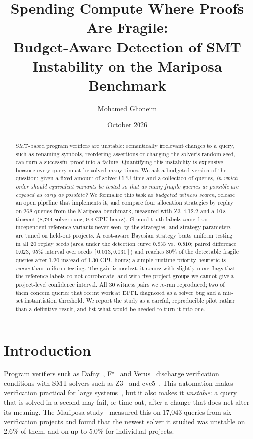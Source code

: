 \documentclass[11pt]{article}
\title{\textbf{Spending Compute Where Proofs Are Fragile:\\
Budget-Aware Detection of SMT Instability on the Mariposa Benchmark}}
\author{Mohamed Ghoneim}
\date{October 2026}
\begin{document}
\maketitle

\begin{abstract}
SMT-based program verifiers are unstable: semantically irrelevant changes to a query, such as renaming symbols, reordering assertions or changing the solver's random seed, can turn a successful proof into a failure. Quantifying this instability is expensive because every query must be solved many times.
We ask a budgeted version of the question: given a fixed amount of solver CPU time and a collection of queries, \emph{in which order should equivalent variants be tested so that as many fragile queries as possible are exposed as early as possible?}
We formalise this task as \emph{budgeted witness search}, release an open pipeline that implements it, and compare four allocation strategies by replay on 268 queries from the Mariposa benchmark, measured with Z3~4.12.2 and a 10\,s timeout (8{,}744 solver runs, 9.8 CPU hours). Ground-truth labels come from independent reference variants never seen by the strategies, and strategy parameters are tuned on held-out projects.
A cost-aware Bayesian strategy beats uniform testing in all 20 replay seeds (area under the detection curve $0.833$ vs.\ $0.810$; paired difference $0.023$, 95\% interval over seeds $[0.013, 0.031]$) and reaches 80\% of the detectable fragile queries after 1.20 instead of 1.30 CPU hours; a simple runtime-priority heuristic is \emph{worse} than uniform testing. The gain is modest, it comes with slightly more flags that the reference labels do not corroborate, and with five project groups we cannot give a project-level confidence interval.
All 30 witness pairs we re-ran reproduced; two of them concern queries that recent work at EPFL diagnosed as a solver bug and a mis-set instantiation threshold.
We report the study as a careful, reproducible pilot rather than a definitive result, and list what would be needed to turn it into one.
\end{abstract}

\section{Introduction}
\label{sec:intro}

Program verifiers such as Dafny~\cite{dafny}, F$^\star$~\cite{fstar} and Verus~\cite{verus} discharge verification conditions with SMT solvers such as Z3~\cite{z3} and cvc5~\cite{cvc5}. This automation makes verification practical for large systems~\cite{ironfleet,komodo,veribetrkv}, but it also makes it \emph{unstable}: a query that is solved in a second may fail, or time out, after a change that does not alter its meaning. The Mariposa study~\cite{mariposa} measured this on 17{,}043 queries from six verification projects and found that the newest solver it studied was unstable on 2.6\% of them, and on up to 5.0\% for individual projects.
\end{document}
